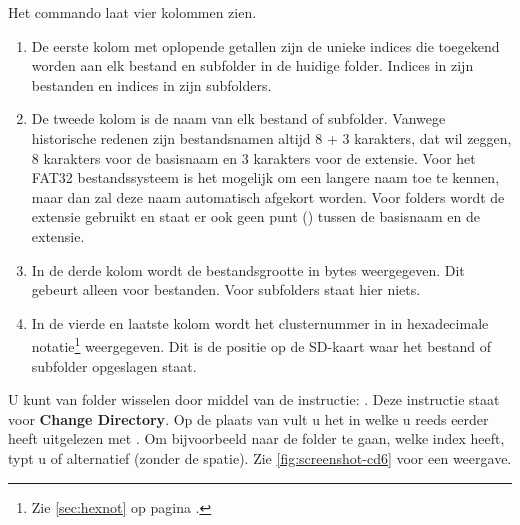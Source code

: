 Het  commando laat vier kolommen zien. 

\begin{enumerate}[noitemsep]
    \item De eerste kolom met oplopende getallen zijn de unieke indices die toegekend worden aan elk bestand en subfolder in de huidige folder. Indices in  zijn bestanden en indices in  zijn subfolders.  
    \item De tweede kolom is de naam van elk bestand of subfolder. Vanwege historische redenen zijn bestandsnamen altijd 8 + 3 karakters, dat wil zeggen, 8 karakters voor de basisnaam en 3 karakters voor de extensie. Voor het FAT32 bestandssysteem is het mogelijk om een langere naam toe te kennen, maar dan zal deze naam automatisch afgekort worden. Voor folders wordt de extensie  gebruikt en staat er ook geen punt () tussen de basisnaam en de extensie.  
    \item In de derde kolom wordt de bestandsgrootte in bytes weergegeven. Dit gebeurt alleen voor bestanden. Voor subfolders staat hier niets. 
    \item In de vierde en laatste kolom wordt het clusternummer in  in hexadecimale notatie\footnote{Zie \cref{sec:hexnot} op pagina \pageref{sec:hexnot}.} weergegeven. Dit is de positie op de SD-kaart waar het bestand of subfolder opgeslagen staat.
\end{enumerate}


U kunt van folder wisselen door middel van de instructie: . Deze instructie staat voor \textbf{Change Directory}. Op de plaats van  vult u het  in welke u reeds eerder heeft uitgelezen met . Om bijvoorbeeld naar de folder  te gaan, welke index  heeft, typt u  of alternatief  (zonder de spatie). Zie \cref{fig:screenshot-cd6} voor een weergave.


